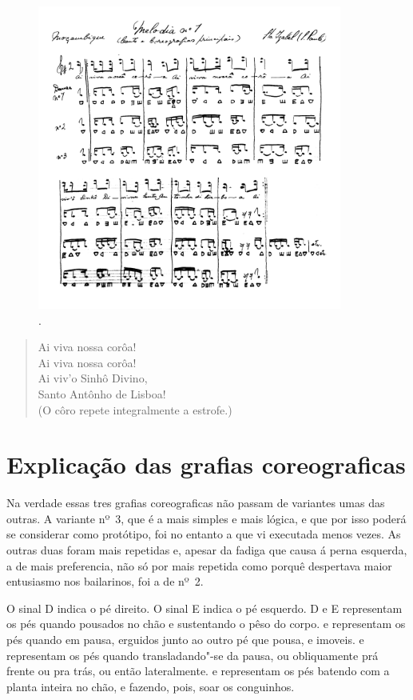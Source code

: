 \begin{figure}[!ht]
\centering
 \includegraphics[width=100mm]{./imgs/img3.png}
\caption{.}
\end{figure}

\begin{verse}
Ai viva nossa corôa!\\
Ai viva nossa corôa!\\
Ai viv'o Sinhô Divino,\\
Santo Antônho de Lisboa!\\[5pt]
(O côro repete integralmente a estrofe.)
\end{verse}

\section*{Explicação das grafias coreograficas}

Na verdade essas tres grafias coreograficas não passam de variantes umas
das outras. A variante nº~3, que é a mais simples e mais lógica, e que
por isso poderá se considerar como protótipo, foi no entanto a que vi
executada menos vezes. As outras duas foram mais repetidas e, apesar da
fadiga que causa á perna esquerda, a de mais preferencia, não só por
mais repetida como porquê despertava maior entusiasmo nos bailarinos,
foi a de nº~2.

O sinal D indica o pé direito. O sinal E indica o pé esquerdo. D e E
representam os pés quando pousados no chão e sustentando o pêso do
corpo.  e  representam os pés quando em pausa, erguidos junto ao
outro pé que pousa, e imoveis.  \hspace{.1pt} e  \hspace{.1pt} representam os pés quando
transladando"-se da pausa, ou obliquamente prá frente ou pra trás, ou
então lateralmente.  e   representam os pés batendo com a planta
inteira no chão, e fazendo, pois, soar os conguinhos.

